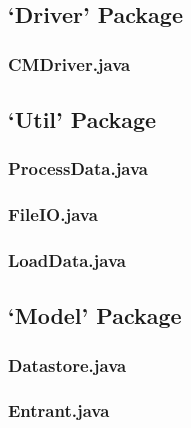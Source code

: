 \documentclass[a4paper, 10pt]{article}
\begin{document}
\subsection{`Driver' Package}

\subsubsection{CMDriver.java}


\clearpage
\subsection{`Util' Package}

\subsubsection{ProcessData.java}


\clearpage
\subsubsection{FileIO.java}


\clearpage
\subsubsection{LoadData.java}


\clearpage
\subsection{`Model' Package}

\subsubsection{Datastore.java}


\clearpage
\subsubsection{Entrant.java}

\end{document}
